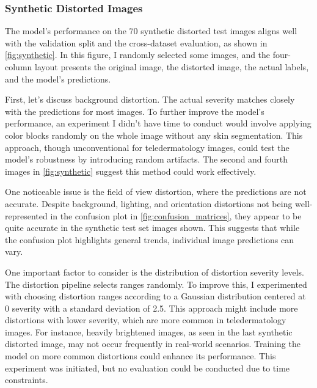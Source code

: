 \subsubsection{Synthetic Distorted Images}
\label{subsubsec:SyntheticDistortedImages}
The model’s performance on the 70 synthetic distorted test images aligns well with the validation split and the cross-dataset evaluation, as shown in \autoref{fig:synthetic}. In this figure, I randomly selected some images, and the four-column layout presents the original image, the distorted image, the actual labels, and the model’s predictions.\par
\vspace{\baselineskip}
\noindent
First, let’s discuss background distortion. The actual severity matches closely with the predictions for most images. To further improve the model’s performance, an experiment I didn’t have time to conduct would involve applying color blocks randomly on the whole image without any skin segmentation. This approach, though unconventional for teledermatology images, could test the model’s robustness by introducing random artifacts. The second and fourth images in \autoref{fig:synthetic} suggest this method could work effectively.\par
\vspace{\baselineskip}
\noindent
One noticeable issue is the field of view distortion, where the predictions are not accurate. Despite background, lighting, and orientation distortions not being well-represented in the confusion plot in \autoref{fig:confusion_matrices}, they appear to be quite accurate in the synthetic test set images shown. This suggests that while the confusion plot highlights general trends, individual image predictions can vary. \par
\vspace{\baselineskip}
\noindent
One important factor to consider is the distribution of distortion severity levels. The distortion pipeline selects ranges randomly. To improve this, I experimented with choosing distortion ranges according to a Gaussian distribution centered at 0 severity with a standard deviation of 2.5. This approach might include more distortions with lower severity, which are more common in teledermatology images. For instance, heavily brightened images, as seen in the last synthetic distorted image, may not occur frequently in real-world scenarios. Training the model on more common distortions could enhance its performance. This experiment was initiated, but no evaluation could be conducted due to time constraints. \par

